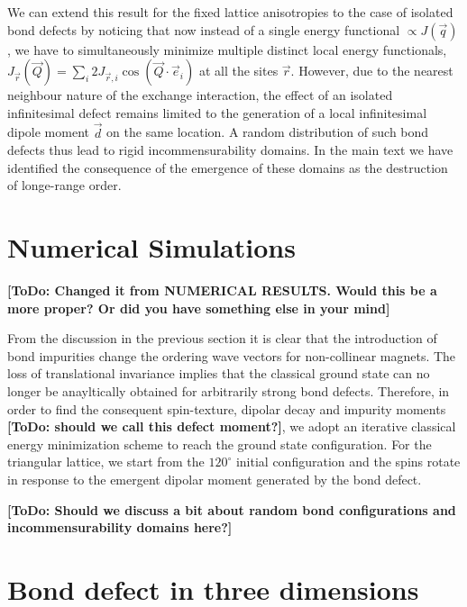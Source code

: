 \documentclass[twocolumn,english,aps,prl,floatfix]{revtex4-1}
\newcommand{\todo}[1]{{\color{red} {\bf [ToDo: #1]}}}
\begin{document}
We can extend this result for the fixed lattice anisotropies to
the case of isolated bond defects by noticing that now instead of 
a single energy functional $\propto J(\vec{q})$,  we have to 
simultaneously minimize multiple distinct local energy functionals, 
$J_{\vec{r}}(\vec{Q})=\sum_{i}2 
J_{\vec{r},i}\cos(\vec{Q}\cdot\vec{e}_i)$ at all the sites $\vec{r}$. 
However, due to the nearest neighbour nature of the exchange interaction, 
the effect of an isolated infinitesimal defect remains limited to the 
generation of a local infinitesimal dipole moment $\vec{d}$ on the same
location. A random distribution of such bond defects thus lead to 
rigid incommensurability domains. In the main text we have identified 
the consequence of the emergence of these domains as the destruction 
of longe-range order.


\section{Numerical Simulations}

\todo{Changed it from NUMERICAL RESULTS. Would this be a more proper? 
Or did you have something else in your mind}

From the discussion in the previous section it is clear that the 
introduction of bond impurities change the ordering wave vectors 
for non-collinear magnets. The loss of translational invariance 
implies that the classical ground state can no longer be anayltically 
obtained for arbitrarily strong bond defects. Therefore, in order to 
find the consequent spin-texture, dipolar decay and impurity moments 
\todo{should we call this defect moment?}, we adopt an iterative 
classical energy minimization scheme \cite{walker77}
to reach the ground state configuration. For the triangular lattice,
we start from the $120^\circ$ initial configuration and the spins 
rotate in response to the emergent dipolar moment generated by the
bond defect.

\todo{Should we discuss a bit about random bond configurations
and incommensurability domains here?}


\section{Bond defect in three dimensions}
\end{document}

